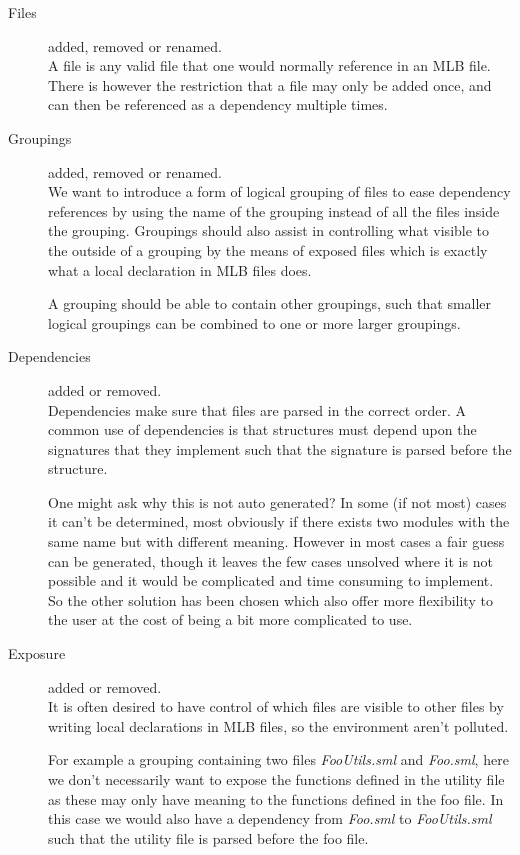 \begin{description}
\item[Files] added, removed or renamed. \\

  A file is any valid file that one would normally reference in an MLB file.
  There is however the restriction that a file may only be added once, and can
  then be referenced as a dependency multiple times.
  
\item[Groupings] added, removed or renamed. \\

  We want to introduce a form of logical grouping of files to ease dependency
  references by using the name of the grouping instead of all the files inside
  the grouping. Groupings should also assist in controlling what visible to the
  outside of a grouping by the means of exposed files which is exactly what a
  local declaration in MLB files does.

  A grouping should be able to contain other groupings, such that smaller
  logical groupings can be combined to one or more larger groupings. 

\item[Dependencies] added or removed. \\

  Dependencies make sure that files are parsed in the correct order. A common
  use of dependencies is that structures must depend upon the signatures that
  they implement such that the signature is parsed before the structure.

  One might ask why this is not auto generated? In some (if not most) cases it
  can't be determined, most obviously if there exists two modules with the same
  name but with different meaning. However in most cases a fair guess can be
  generated, though it leaves the few cases unsolved where it is not possible
  and it would be complicated and time consuming to implement. So the other
  solution has been chosen which also offer more flexibility to the user at the
  cost of being a bit more complicated to use.

\item[Exposure] added or removed. \\

  It is often desired to have control of which files are visible to other files
  by writing local declarations in MLB files, so the environment aren't
  polluted.  

  For example a grouping containing two files \textit{FooUtils.sml} and
  \textit{Foo.sml}, here we don't necessarily want to expose the functions
  defined in the utility file as these may only have meaning to the functions
  defined in the foo file. In this case we would also have a dependency from
  \textit{Foo.sml} to \textit{FooUtils.sml} such that the utility file is parsed
  before the foo file.



\end{description}
